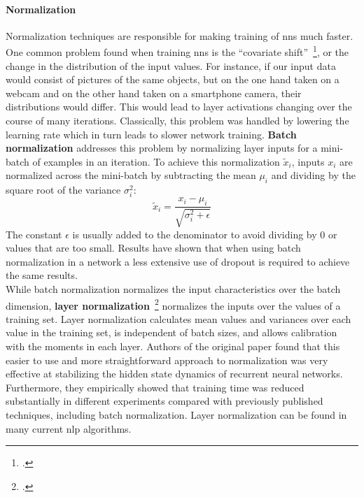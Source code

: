 \paragraph{Normalization}
Normalization techniques are responsible for making training of \gls{nn}s much faster. One common problem found when training \gls{nn}s is the ``covariate shift''~\footcite{DBLP:journals/corr/IoffeS15}, or the change in the distribution of the input values. For instance, if our input data would consist of pictures of the same objects, but on the one hand taken on a webcam and on the other hand taken on a smartphone camera, their distributions would differ. This would lead to layer activations changing over the course of many iterations. Classically, this problem was handled by lowering the learning rate which in turn leads to slower network training. \textbf{Batch normalization} addresses this problem by normalizing layer inputs for a mini-batch of examples in an iteration. To achieve this normalization $ \widetilde{x}_i $, inputs $ x_i $ are normalized across the mini-batch by subtracting the mean $ \mu_i $ and dividing by the square root of the variance $ \sigma_i^2 $:
\begin{equation}
	\widetilde{x}_i = \frac{x_i - \mu_i}{\sqrt{\sigma_i^2 + \epsilon}}
\end{equation}
The constant $ \epsilon $ is usually added to the denominator to avoid dividing by $ 0 $ or values that are too small. Results have shown that when using batch normalization in a network a less extensive use of dropout is required to achieve the same results. \\
While batch normalization normalizes the input characteristics over the batch dimension, \textbf{layer normalization}~\footcite{ba2016layer} normalizes the inputs over the values of a training set. Layer normalization calculates mean values and variances over each value in the training set, is independent of batch sizes, and allows calibration with the moments in each layer. Authors of the original paper found that this easier to use and more straightforward approach to normalization was very effective at stabilizing the hidden state dynamics of recurrent neural networks. Furthermore, they empirically showed that training time was reduced substantially in different experiments compared with previously published techniques, including batch normalization. Layer normalization can be found in many current \gls{nlp} algorithms.

